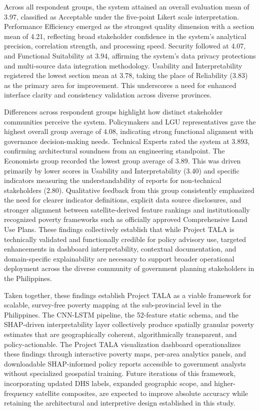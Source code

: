\documentclass[12pt, letterpaper]{article}
\numberwithin{figure}{section}
\numberwithin{table}{section}
\begin{document}
Across all respondent groups, the system attained an overall
evaluation mean of 3.97, classified as Acceptable under the
five-point Likert scale interpretation. Performance Efficiency
emerged as the strongest quality dimension with a section mean of
4.21, reflecting broad stakeholder confidence in the system's
analytical precision, correlation strength, and processing speed.
Security followed at 4.07, and Functional Suitability at 3.94,
affirming the system's data privacy protections and multi-source data
integration methodology. Usability and Interpretability registered
the lowest section mean at 3.78, taking the place of Reliability
(3.83) as the primary area for improvement. This underscores a need
for enhanced interface clarity and consistency validation across
diverse provinces.

Differences across respondent groups highlight how distinct
stakeholder communities perceive the system. Policymakers and LGU
representatives gave the highest overall group average of 4.08,
indicating strong functional alignment with governance
decision-making needs. Technical Experts rated the system at 3.893,
confirming architectural soundness from an engineering standpoint.
The Economists group recorded the lowest group average of 3.89. This
was driven primarily by lower scores in Usability and
Interpretability (3.40) and specific indicators measuring the
understandability of reports for non-technical stakeholders (2.80).
Qualitative feedback from this group consistently emphasized the need
for clearer indicator definitions, explicit data source disclosures,
and stronger alignment between satellite-derived feature rankings and
institutionally recognized poverty frameworks such as officially
approved Comprehensive Land Use Plans. These findings collectively
establish that while Project TALA is technically validated and
functionally credible for policy advisory use, targeted enhancements
in dashboard interpretability, contextual documentation, and
domain-specific explainability are necessary to support broader
operational deployment across the diverse community of government
planning stakeholders in the Philippines.

Taken together, these findings establish Project TALA as a viable
framework for scalable, survey-free poverty mapping at the
sub-provincial level in the Philippines. The CNN-LSTM pipeline, the
52-feature static schema, and the SHAP-driven interpretability layer
collectively produce spatially granular poverty estimates that are
geographically coherent, algorithmically transparent, and
policy-actionable. The Project TALA visualization dashboard
operationalizes these findings through interactive poverty maps,
per-area analytics panels, and downloadable SHAP-informed policy
reports accessible to government analysts without specialized
geospatial training. Future iterations of this framework,
incorporating updated DHS labels, expanded geographic scope, and
higher-frequency satellite composites, are expected to improve
absolute accuracy while retaining the architectural and interpretive
design established in this study.
\end{document}
